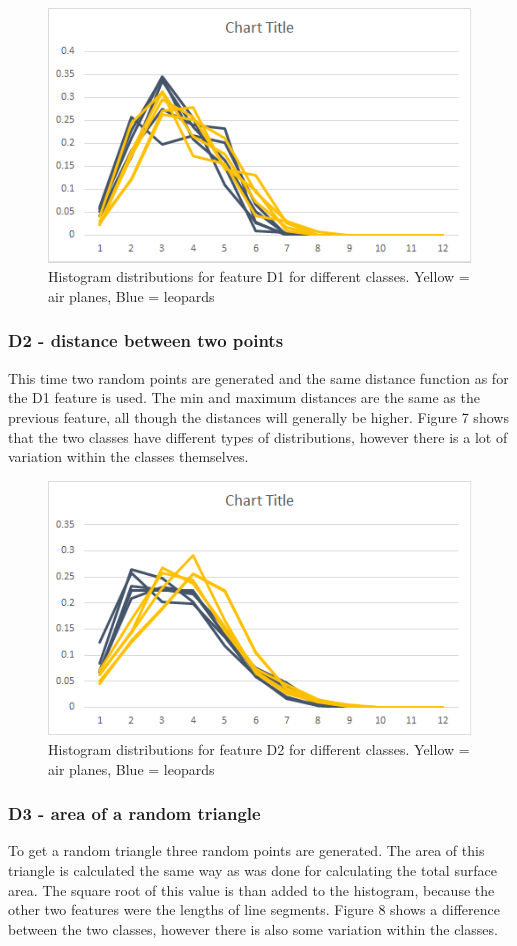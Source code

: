 \documentclass{bigdata}
\begin{document}
\begin{figure}[h!]
    \includegraphics[width=0.7\linewidth]{Pictures/Part3/D1.png}
    \caption{Histogram distributions for feature D1 for different classes. Yellow = air planes, Blue = leopards}
  \label{fig:eccentricity}
\end{figure}

\subsubsection{D2 - distance between two points}
This time two random points are generated and the same distance function as for the D1 feature is used. The min and maximum distances are the same as the previous feature, all though the distances will generally be higher.
Figure 7 shows that the two classes have different types of distributions, however there is a lot of variation within the classes themselves.
\begin{figure}[h!]
    \includegraphics[width=0.7\linewidth]{Pictures/Part3/D2.png}
    \caption{Histogram distributions for feature D2 for different classes. Yellow = air planes, Blue = leopards}
  \label{fig:eccentricity}
\end{figure}

\subsubsection{D3 - area of a random triangle}
To get a random triangle three random points are generated. The area of this triangle is calculated the same way as was done for calculating the total surface area. The square root of this value is than added to the histogram, because the other two features were the lengths of line segments.
Figure 8 shows a difference between the two classes, however there is also some variation within the classes. 
\end{document}
